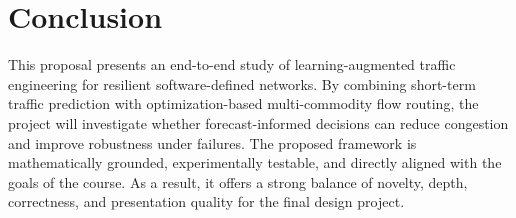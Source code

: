 \documentclass[11pt]{article}
\begin{document}
\section{Conclusion}
This proposal presents an end-to-end study of learning-augmented traffic engineering for resilient software-defined networks. By combining short-term traffic prediction with optimization-based multi-commodity flow routing, the project will investigate whether forecast-informed decisions can reduce congestion and improve robustness under failures. The proposed framework is mathematically grounded, experimentally testable, and directly aligned with the goals of the course. As a result, it offers a strong balance of novelty, depth, correctness, and presentation quality for the final design project.
\end{document}
